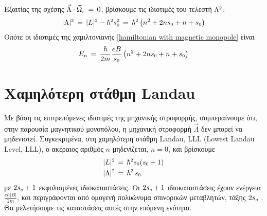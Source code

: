 Εξαιτίας της σχέσης $\Vec{\Lambda}\cdot\Vec{\Omega}\subscr{r}\,=\,0$, βρίσκουμε τις ιδιοτιμές του τελεστή $\Lambda\superscr{2}$: 
\begin{equation}
    |\Lambda|\superscr{2}\,=\,|L|\superscr{2}-\hbar\superscr{2}s\superscr{2}\subscr{0}\,=\,\hbar\superscr{2}\left( n^2 +2ns\subscr{0} + n + s\subscr{0} \right)
\end{equation}
Οπότε οι ιδιοτιμές της χαμιλτονιανής \eqref{hamiltonian with magnetic monopole} είναι 
\begin{equation*}
    E_n\,=\,\frac{\hbar}{2m}\frac{eB}{s\subscr{0}}\left( n^2 +2ns\subscr{0} + n + s\subscr{0} \right)
\end{equation*}

\section{Χαμηλότερη στάθμη Landau}\label{section LLL degeneracy}
Με βάση τις επιτρεπόμενες ιδιοτιμές της μηχανικής στροφορμής, συμπεραίνουμε ότι, στην παρουσία μαγνητικού μονοπόλου, η μηχανική στροφορμή $\Vec{\Lambda}$ δεν μπορεί να μηδενιστεί. Συγκεκριμένα, στη χαμηλότερη στάθμη Landau, LLL (Lowest Landau Level, LLL), ο ακέραιος αριθμός $n$ μηδενίζεται, $n=0$, και βρίσκουμε
\begin{equation}\label{eigenvalues in LLL}
\begin{split}
    &|L|\superscr{2}\,=\,\hbar\superscr{2}s\subscr{0}(s\subscr{0}+1)\\
    &|\Lambda|\superscr{2}\,=\,\hbar\superscr{2}\,s\subscr{0}
\end{split}
\end{equation}
με $2s\subscr{o}+1$ εκφυλισμένες ιδιοκαταστάσεις.
Οι $2s\subscr{o}+1$ ιδιοκαταστάσεις έχουν ενέργεια $\frac{e\hbar|B|}{2m}$, και περιγράφονται από ομογενή πολυώνυμα σπινορικών μεταβλητών, τάξης $2s\subscr{o}$ \cite{PhysRevLett.51.605}. Θα μελετήσουμε τις καταστάσεις αυτές στην επόμενη ενότητα.

